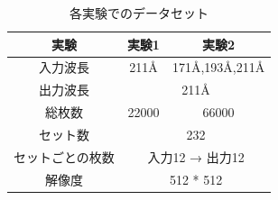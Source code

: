 \begin{table}[h]
    \centering
    \begin{tabular}{|c|c|c|}
    \hline
    実験 & 実験1 & 実験2 \\
    \hline\hline
    入力波長 & 211Å & 171Å,193Å,211Å \\
    \hline
    出力波長 & \multicolumn{2}{c|}{211Å} \\
    \hline
    総枚数 & 22000 & 66000 \\
    \hline
    セット数 & \multicolumn{2}{c|}{232} \\
    \hline
    セットごとの枚数 & \multicolumn{2}{c|}{入力12 → 出力12} \\
    \hline
    解像度 & \multicolumn{2}{c|}{512 * 512} \\
    \hline
    \end{tabular}
    \caption{各実験でのデータセット}
    \label{tab:my_label}
\end{table}




